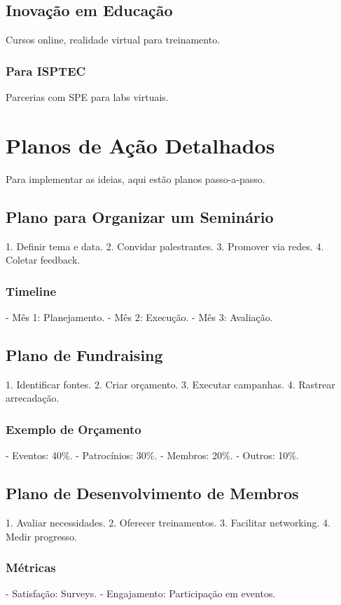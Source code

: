 \documentclass[12pt]{article}
\begin{document}
\subsection{Inovação em Educação}
Cursos online, realidade virtual para treinamento.

\subsubsection{Para ISPTEC}
Parcerias com SPE para labs virtuais.

\newpage

\section{Planos de Ação Detalhados}

Para implementar as ideias, aqui estão planos passo-a-passo.

\subsection{Plano para Organizar um Seminário}
1. Definir tema e data.
2. Convidar palestrantes.
3. Promover via redes.
4. Coletar feedback.

\subsubsection{Timeline}
- Mês 1: Planejamento.
- Mês 2: Execução.
- Mês 3: Avaliação.

\subsection{Plano de Fundraising}
1. Identificar fontes.
2. Criar orçamento.
3. Executar campanhas.
4. Rastrear arrecadação.

\subsubsection{Exemplo de Orçamento}
- Eventos: 40\%.
- Patrocínios: 30\%.
- Membros: 20\%.
- Outros: 10\%.

\subsection{Plano de Desenvolvimento de Membros}
1. Avaliar necessidades.
2. Oferecer treinamentos.
3. Facilitar networking.
4. Medir progresso.

\subsubsection{Métricas}
- Satisfação: Surveys.
- Engajamento: Participação em eventos.
\end{document}
